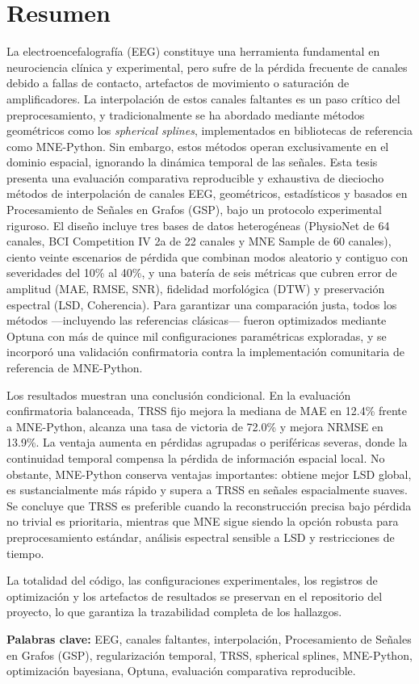 \chapter*{Resumen}

La electroencefalografía (EEG) constituye una herramienta fundamental en neurociencia clínica y experimental, pero sufre de la pérdida frecuente de canales debido a fallas de contacto, artefactos de movimiento o saturación de amplificadores. La interpolación de estos canales faltantes es un paso crítico del preprocesamiento, y tradicionalmente se ha abordado mediante métodos geométricos como los \textit{spherical splines}, implementados en bibliotecas de referencia como MNE-Python. Sin embargo, estos métodos operan exclusivamente en el dominio espacial, ignorando la dinámica temporal de las señales.
Esta tesis presenta una evaluación comparativa reproducible y exhaustiva de dieciocho métodos de interpolación de canales EEG, geométricos, estadísticos y basados en Procesamiento de Señales en Grafos (GSP), bajo un protocolo experimental riguroso. El diseño incluye tres bases de datos heterogéneas (PhysioNet de 64 canales, BCI Competition IV 2a de 22 canales y MNE Sample de 60 canales), ciento veinte escenarios de pérdida que combinan modos aleatorio y contiguo con severidades del 10\% al 40\%, y una batería de seis métricas que cubren error de amplitud (MAE, RMSE, SNR), fidelidad morfológica (DTW) y preservación espectral (LSD, Coherencia). Para garantizar una comparación justa, todos los métodos —incluyendo las referencias clásicas— fueron optimizados mediante Optuna con más de quince mil configuraciones paramétricas exploradas, y se incorporó una validación confirmatoria contra la implementación comunitaria de referencia de MNE-Python.

Los resultados muestran una conclusión condicional. En la evaluación confirmatoria balanceada, TRSS fijo mejora la mediana de MAE en 12.4\% frente a MNE-Python, alcanza una tasa de victoria de 72.0\% y mejora NRMSE en 13.9\%. La ventaja aumenta en pérdidas agrupadas o periféricas severas, donde la continuidad temporal compensa la pérdida de información espacial local. No obstante, MNE-Python conserva ventajas importantes: obtiene mejor LSD global, es sustancialmente más rápido y supera a TRSS en señales espacialmente suaves. Se concluye que TRSS es preferible cuando la reconstrucción precisa bajo pérdida no trivial es prioritaria, mientras que MNE sigue siendo la opción robusta para preprocesamiento estándar, análisis espectral sensible a LSD y restricciones de tiempo.

La totalidad del código, las configuraciones experimentales, los registros de optimización y los artefactos de resultados se preservan en el repositorio del proyecto, lo que garantiza la trazabilidad completa de los hallazgos.

\vspace{1em}
\noindent\textbf{Palabras clave:} EEG, canales faltantes, interpolación, Procesamiento de Señales en Grafos (GSP), regularización temporal, TRSS, spherical splines, MNE-Python, optimización bayesiana, Optuna, evaluación comparativa reproducible.